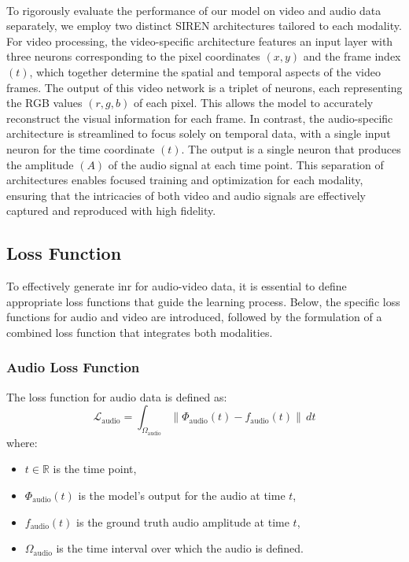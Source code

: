 \documentclass{ioereport}
\begin{document}
    \\
    To rigorously evaluate the performance of our model on video and audio data separately, we employ two distinct SIREN architectures tailored to each modality. For video processing, the video-specific architecture features an input layer with three neurons corresponding to the pixel coordinates \((x, y)\) and the frame index \((t)\), which together determine the spatial and temporal aspects of the video frames. The output of this video network is a triplet of neurons, each representing the RGB values \((r, g, b)\) of each pixel. This allows the model to accurately reconstruct the visual information for each frame. In contrast, the audio-specific architecture is streamlined to focus solely on temporal data, with a single input neuron for the time coordinate \((t)\). The output is a single neuron that produces the amplitude \((A)\) of the audio signal at each time point. This separation of architectures enables focused training and optimization for each modality, ensuring that the intricacies of both video and audio signals are effectively captured and reproduced with high fidelity.

    \subsection{Loss Function}
    To effectively generate \gls{inr} for audio-video data, it is essential to define appropriate loss functions that guide the learning process. Below, the specific loss functions for audio and video are introduced, followed by the formulation of a combined loss function that integrates both modalities.

        \subsubsection{Audio Loss Function}
        The loss function for audio data is defined as:
        \begin{equation}
            \mathcal{L}_{\text{audio}} = \int_{\Omega_{\text{audio}}} \| \Phi_{\text{audio}}(t) - f_{\text{audio}}(t) \| \, dt
        \end{equation}
        where:
        \begin{itemize}
            \item \( t \in \mathbb{R} \) is the time point,
            \item  \( \Phi_{\text{audio}}(t) \) is the model's output for the audio at time \( t \),
            \item \( f_{\text{audio}}(t) \) is the ground truth audio amplitude at time \( t \),
            \item \( \Omega_{\text{audio}} \) is the time interval over which the audio is defined.
        \end{itemize}
    
\end{document}
